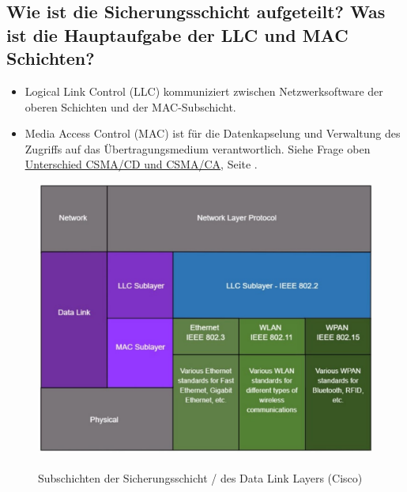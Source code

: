 \pagebreak
\subsection*{Wie ist die Sicherungsschicht aufgeteilt? Was ist die Hauptaufgabe der LLC und MAC Schichten?}\label{sub:LLC_MAC}
\begin{itemize}
    \item Logical Link Control (LLC) kommuniziert zwischen Netzwerksoftware der oberen Schichten und der MAC-Subschicht.
    \item Media Access Control (MAC) ist für die Datenkapselung und Verwaltung des Zugriffs auf das Übertragungsmedium verantwortlich. Siehe Frage oben \underline{\hyperref[sub:csma]{Unterschied CSMA/CD und CSMA/CA}}, Seite \pageref{sub:csma}.
\end{itemize}

\begin{figure}[H]
    \begin{center}
    \label{pic:DataLinkLayer_LLC_MAC}
    \includegraphics[width=\textwidth]{images/DLL_Sublayers.jpg}
    \caption{Subschichten der Sicherungsschicht / des Data Link Layers (\textsuperscript{\textcopyright}Cisco)}
    \end{center}
\end{figure}

